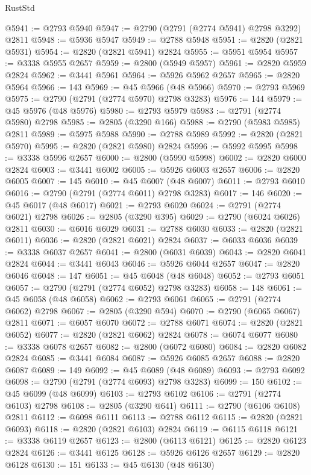 \begin{lexlean}{RustStd}
\begin{coremodule}
@5941 := @2793 @5940
@5947 := @2790 (@2791 (@2774 @5941) @2798 @3292) @2811
@5948 := @5936 @5947
@5949 := @2788 @5948
@5951 := @2820 (@2821 @5931)
@5954 := @2820 (@2821 @5941) @2824
@5955 := @5951 @5954
@5957 := @3338 @5955 @2657
@5959 := @2800 (@5949 @5957)
@5961 := @2820 @5959 @2824
@5962 := @3441 @5961
@5964 := @5926 @5962 @2657
@5965 := @2820 @5964
@5966 := 143
@5969 := @45 @5966 (@48 @5966)
@5970 := @2793 @5969
@5975 := @2790 (@2791 (@2774 @5970) @2798 @3283)
@5976 := 144
@5979 := @45 @5976 (@48 @5976)
@5980 := @2793 @5979
@5983 := @2791 (@2774 @5980) @2798
@5985 := @2805 (@3290 @166)
@5988 := @2790 (@5983 @5985) @2811
@5989 := @5975 @5988
@5990 := @2788 @5989
@5992 := @2820 (@2821 @5970)
@5995 := @2820 (@2821 @5980) @2824
@5996 := @5992 @5995
@5998 := @3338 @5996 @2657
@6000 := @2800 (@5990 @5998)
@6002 := @2820 @6000 @2824
@6003 := @3441 @6002
@6005 := @5926 @6003 @2657
@6006 := @2820 @6005
@6007 := 145
@6010 := @45 @6007 (@48 @6007)
@6011 := @2793 @6010
@6016 := @2790 (@2791 (@2774 @6011) @2798 @3283)
@6017 := 146
@6020 := @45 @6017 (@48 @6017)
@6021 := @2793 @6020
@6024 := @2791 (@2774 @6021) @2798
@6026 := @2805 (@3290 @395)
@6029 := @2790 (@6024 @6026) @2811
@6030 := @6016 @6029
@6031 := @2788 @6030
@6033 := @2820 (@2821 @6011)
@6036 := @2820 (@2821 @6021) @2824
@6037 := @6033 @6036
@6039 := @3338 @6037 @2657
@6041 := @2800 (@6031 @6039)
@6043 := @2820 @6041 @2824
@6044 := @3441 @6043
@6046 := @5926 @6044 @2657
@6047 := @2820 @6046
@6048 := 147
@6051 := @45 @6048 (@48 @6048)
@6052 := @2793 @6051
@6057 := @2790 (@2791 (@2774 @6052) @2798 @3283)
@6058 := 148
@6061 := @45 @6058 (@48 @6058)
@6062 := @2793 @6061
@6065 := @2791 (@2774 @6062) @2798
@6067 := @2805 (@3290 @594)
@6070 := @2790 (@6065 @6067) @2811
@6071 := @6057 @6070
@6072 := @2788 @6071
@6074 := @2820 (@2821 @6052)
@6077 := @2820 (@2821 @6062) @2824
@6078 := @6074 @6077
@6080 := @3338 @6078 @2657
@6082 := @2800 (@6072 @6080)
@6084 := @2820 @6082 @2824
@6085 := @3441 @6084
@6087 := @5926 @6085 @2657
@6088 := @2820 @6087
@6089 := 149
@6092 := @45 @6089 (@48 @6089)
@6093 := @2793 @6092
@6098 := @2790 (@2791 (@2774 @6093) @2798 @3283)
@6099 := 150
@6102 := @45 @6099 (@48 @6099)
@6103 := @2793 @6102
@6106 := @2791 (@2774 @6103) @2798
@6108 := @2805 (@3290 @641)
@6111 := @2790 (@6106 @6108) @2811
@6112 := @6098 @6111
@6113 := @2788 @6112
@6115 := @2820 (@2821 @6093)
@6118 := @2820 (@2821 @6103) @2824
@6119 := @6115 @6118
@6121 := @3338 @6119 @2657
@6123 := @2800 (@6113 @6121)
@6125 := @2820 @6123 @2824
@6126 := @3441 @6125
@6128 := @5926 @6126 @2657
@6129 := @2820 @6128
@6130 := 151
@6133 := @45 @6130 (@48 @6130)

\end{coremodule}
\end{lexlean}

